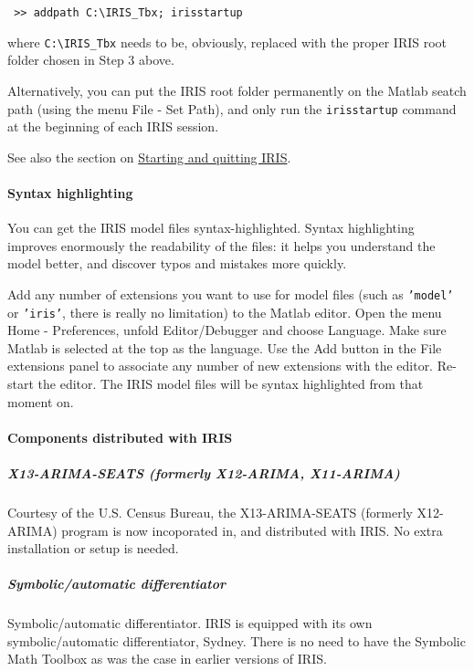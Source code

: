  \begin{verbatim}
 >> addpath C:\IRIS_Tbx; irisstartup
 \end{verbatim}
 
 where \texttt{C:\textbackslash{}IRIS\_Tbx} needs to be, obviously,
 replaced with the proper IRIS root folder chosen in Step 3 above.
 
 Alternatively, you can put the IRIS root folder permanently on the
 Matlab seatch path (using the menu File - Set Path), and only run the
 \texttt{irisstartup} command at the beginning of each IRIS session.
 
 See also the section on \href{config/Contents}{Starting and quitting
 IRIS}.
 
 \paragraph{Syntax highlighting}
 
 You can get the IRIS model files syntax-highlighted. Syntax highlighting
 improves enormously the readability of the files: it helps you
 understand the model better, and discover typos and mistakes more
 quickly.
 
 Add any number of extensions you want to use for model files (such as
 \texttt{'model'} or \texttt{'iris'}, there is really no limitation) to
 the Matlab editor. Open the menu Home - Preferences, unfold
 Editor/Debugger and choose Language. Make sure Matlab is selected at the
 top as the language. Use the Add button in the File extensions panel to
 associate any number of new extensions with the editor. Re-start the
 editor. The IRIS model files will be syntax highlighted from that moment
 on.
 
 \paragraph{Components distributed with IRIS}
 
 \subparagraph{X13-ARIMA-SEATS (formerly X12-ARIMA, X11-ARIMA)}
 
 Courtesy of the U.S. Census Bureau, the X13-ARIMA-SEATS (formerly
 X12-ARIMA) program is now incoporated in, and distributed with IRIS. No
 extra installation or setup is needed.
 
 \subparagraph{Symbolic/automatic differentiator}
 
 Symbolic/automatic differentiator. IRIS is equipped with its own
 symbolic/automatic differentiator, Sydney. There is no need to have the
 Symbolic Math Toolbox as was the case in earlier versions of IRIS.



